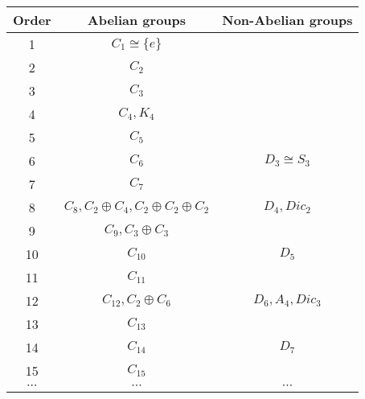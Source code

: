 \documentclass[12pt]{article}
\begin{document}
{\centering
\begin{tabular}{|c|c|c|}
    \hline
    Order & Abelian groups & Non-Abelian groups \\
    \hline
    \hline
    1 & $C_1 \cong \{e\}$ & \\
    \hline
    2 & $C_2$ & \\
    \hline
    3 & $C_3$ & \\
    \hline
    4 & $C_4, K_4$ & \\
    \hline
    5 & $C_5$ & \\
    \hline
    6 & $C_6$ &  $D_3 \cong S_3$ \\
    \hline
    7 & $C_7$ & \\
    \hline
    8 & $C_8, C_2 \oplus C_4, C_2 \oplus C_2 \oplus C_2$ & $D_4, Dic_2$\\
    \hline
    9 & $C_9, C_3 \oplus C_3$ & \\
    \hline
    10 & $C_{10}$ & $D_5$ \\
    \hline
    11 & $C_{11}$ & \\
    \hline
    12 & $C_{12}, C_2 \oplus C_6$ & $D_6, A_4, Dic_3$ \\
    \hline
    13 & $C_{13}$ & \\
    \hline
    14 & $C_{14}$ & $D_7$ \\
    \hline
    15 & $C_{15}$ & \\
    \hline
    $\cdots$ & $\cdots$ & $\cdots$ \\
    \hline
\end{tabular}\par}
\bigskip
\end{document}
